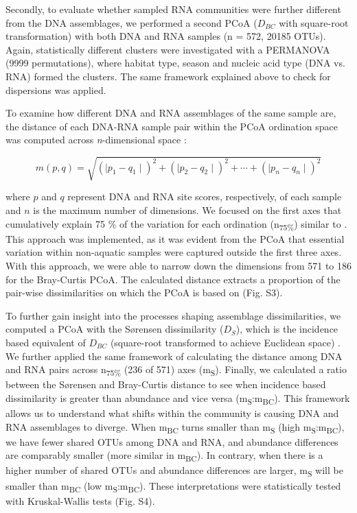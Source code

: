 \documentclass[12pt,a4paper]{article} %
\begin{document}
Secondly, to evaluate whether sampled RNA communities were further different from the DNA assemblages, we performed a second PCoA ($D_{BC}$ with square-root transformation) with both DNA and RNA samples (n = 572, 20185 OTUs). Again, statistically different clusters were investigated with a PERMANOVA (9999 permutations), where habitat type, season and nucleic acid type (DNA vs. RNA) formed the clusters. The same framework explained above to check for dispersions was applied.

To examine how different DNA and RNA assemblages of the same sample are, the distance of each DNA-RNA sample pair within the PCoA ordination space was computed across \textit{n}-dimensional space \citep{Tabak2004}:


\[ m(p,q) = \sqrt{(\mid p_{1} - q_{1} \mid)^2 + (\mid p_{2} - q_{2} \mid)^2 + \cdots + (\mid p_{n} - q_{n} \mid)^2}\]


where $p$ and $q$ represent DNA and RNA site scores, respectively, of each sample and $n$ is the maximum number of dimensions. We focused on the first axes that cumulatively explain 75 \% of the variation for each ordination (n\textsubscript{75\%}) similar to \citet{Osterholz2016}. This approach was implemented, as it was evident from the PCoA that essential variation within non-aquatic samples were captured outside the first three axes. With this approach, we were able to narrow down the dimensions from 571 to 186 for the Bray-Curtis PCoA. The calculated distance extracts a proportion of the pair-wise dissimilarities on which the PCoA is based on (Fig. S3).

To further gain insight into the processes shaping assemblage dissimilarities, we computed a PCoA with the S{\o}rensen dissimilarity ($D_{S}$), which is the incidence based equivalent of $D_{BC}$ (square-root transformed to achieve Euclidean space) \citep{Sorensen1948, Legendre1998}. We further applied the same framework of calculating the distance among DNA and RNA pairs across n\textsubscript{75\%} (236 of 571) axes (m\textsubscript{S}). Finally, we calculated a ratio between the S{\o}rensen and Bray-Curtis distance to see when incidence based dissimilarity is greater than abundance and vice versa (m\textsubscript{S}:m\textsubscript{BC}). This framework allows us to understand what shifts within the community is causing DNA and RNA assemblages to diverge. When m\textsubscript{BC} turns smaller than m\textsubscript{S} (high m\textsubscript{S}:m\textsubscript{BC}), we have fewer shared OTUs among DNA and RNA, and abundance differences are comparably smaller (more similar in m\textsubscript{BC}). In contrary, when there is a higher number of shared OTUs and abundance differences are larger, m\textsubscript{S} will be smaller than m\textsubscript{BC} (low m\textsubscript{S}:m\textsubscript{BC}). These interpretations were statistically tested with Kruskal-Wallis tests (Fig. S4).
\end{document}
